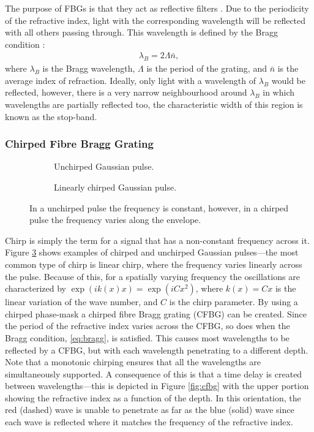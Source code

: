 The purpose of FBGs is that they act as reflective filters \cite{agrawal2002, alazzawi, ferreira, starodoumov}. Due to the periodicity of the refractive index, light with the corresponding wavelength will be reflected with all others passing through. This wavelength is defined by the Bragg condition \cite{agrawal2002, alazzawi, becker, ferreira, silfvast, starodoumov}:
\begin{align}
\label{eq:bragg}
\lambda_B = 2 \Lambda \bar{n},
\end{align}
where $\lambda_B$ is the Bragg wavelength, $\Lambda$ is the period of the grating, and $\bar{n}$ is the average index of refraction. Ideally, only light with a wavelength of $\lambda_B$ would be reflected, however, there is a very narrow neighbourhood around $\lambda_B$ in which wavelengths are partially reflected too, the characteristic width of this region is known as the stop-band. \\

\subsubsection{Chirped Fibre Bragg Grating}
\begin{figure}[tbp]
\begin{subfigure}{0.5\textwidth}

\caption{Unchirped Gaussian pulse.}
\label{fig:unchirped}
\end{subfigure}
\begin{subfigure}{0.5\textwidth}

\caption{Linearly chirped Gaussian pulse.}
\label{fig:chirped}
\end{subfigure}
\caption[Comparison of a chirped and unchirped Gaussian pulse.]{In a unchirped pulse the frequency is constant, however, in a chirped pulse the frequency varies along the envelope.}
\label{fig:chirp}
\end{figure}

Chirp is simply the term for a signal that has a non-constant frequency across it. Figure \ref{fig:chirp} shows examples of chirped and unchirped Gaussian pulses---the most common type of chirp is linear chirp, where the frequency varies linearly across the pulse. Because of this, for a spatially varying frequency the oscillations are characterized by $\exp \left( i k(x) x \right) = \exp \left( i C x^2 \right)$, where $k(x) = Cx$ is the linear variation of the wave number, and $C$ is the chirp parameter. By using a chirped phase-mask a chirped fibre Bragg grating (CFBG) can be created. Since the period of the refractive index varies across the CFBG, so does when the Bragg condition, \eqref{eq:bragg}, is satisfied. This causes most wavelengths to be reflected by a CFBG, but with each wavelength penetrating to a different depth. Note that a monotonic chirping ensures that all the wavelengths are simultaneously supported. A consequence of this is that a time delay is created between wavelengths---this is depicted in Figure \ref{fig:cfbg} with the upper portion showing  the refractive index as a function of the depth. In this orientation, the red (dashed) wave is unable to penetrate as far as the blue (solid) wave since each wave is reflected where it matches the frequency of the refractive index.  \\

